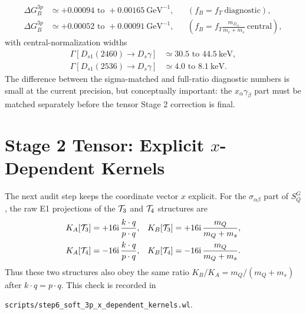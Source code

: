 \documentclass[11pt]{article}
\newcommand{\ii}{\mathrm{i}}
\begin{document}
\begin{align}
  \Delta G_B^{3p}
  &\simeq +0.00094\text{ to }+0.00165\ \mathrm{GeV}^{-1},
  &&(f_B=f_T\ \text{diagnostic}),\\
  \Delta G_B^{3p}
  &\simeq +0.00052\text{ to }+0.00091\ \mathrm{GeV}^{-1},
  &&\left(f_B=f_T\frac{m_{D_{s1}}}{m_c+m_s}\ \text{central}\right),
\end{align}
with central-normalization widths
\begin{align}
  \Gamma[D_{s1}(2460)\to D_s\gamma]
  &\simeq 30.5\text{ to }44.5\ \mathrm{keV},\\
  \Gamma[D_{s1}(2536)\to D_s\gamma]
  &\simeq 4.0\text{ to }8.1\ \mathrm{keV}.
\end{align}
The difference between the sigma-matched and full-ratio diagnostic numbers is
small at the current precision, but conceptually important: the
$x_\alpha\gamma_\beta$ part must be matched separately before the tensor
Stage 2 correction is final.

\section{Stage 2 Tensor: Explicit \(x\)-Dependent Kernels}

The next audit step keeps the coordinate vector $x$ explicit.  For the
$\sigma_{\alpha\beta}$ part of $S_Q^G$, the raw E1 projections of the
${\cal T}_3$ and ${\cal T}_4$ structures are
\begin{align}
  K_A[{\cal T}_3]&=+16\ii\,\frac{k\cdot q}{p\cdot q},
  &
  K_B[{\cal T}_3]&=+16\ii\,\frac{m_Q}{m_Q+m_s},\\
  K_A[{\cal T}_4]&=-16\ii\,\frac{k\cdot q}{p\cdot q},
  &
  K_B[{\cal T}_4]&=-16\ii\,\frac{m_Q}{m_Q+m_s}.
\end{align}
Thus these two structures also obey the same ratio
$K_B/K_A=m_Q/(m_Q+m_s)$ after $k\cdot q=p\cdot q$.  This check is recorded in
\begin{center}
  \texttt{scripts/step6\_soft\_3p\_x\_dependent\_kernels.wl}.
\end{center}
\end{document}
